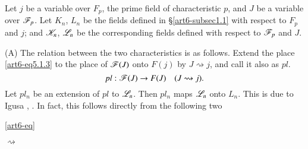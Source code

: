 Let $j$ be a variable over $F_p$, the prime field of characteristic $p$, and $J$ be a variable over $\mathscr{F}_p$. Let $K_n$, $L_n$ be the fields defined in \S \eqref{art6-subsec1.1} with respect to $F_p$ and $j$; and $\mathscr{K}_n$, $\mathscr{L}_n$ be the corresponding fields defined with respect to $\mathscr{F}_p$ and $J$.

(A) The relation between the two characteristics is as follows. Extend the place \eqref{art6-eq5.1.3} to the place of $\mathscr{F} (J)$ onto $F(j)$ by $J \rightsquigarrow j$, and call it also as $pl$.
\begin{equation}
pl : \mathscr{F} (J) \to F (J) \quad (J \rightsquigarrow j). 
\label{art6-eq5.2.1}
\end{equation}
Let $pl_n$ be an extension of $pl$ to $\mathscr{L}_n$. Then $pl_n$ maps $\mathscr{L}_n$ onto $L_n$. This is due to Igusa \cite{art6-key5}, \cite{art6-key6}. In fact, this follows directly from the following two\pageoriginale



\eqref{art6-eq}





$\rightsquigarrow$


